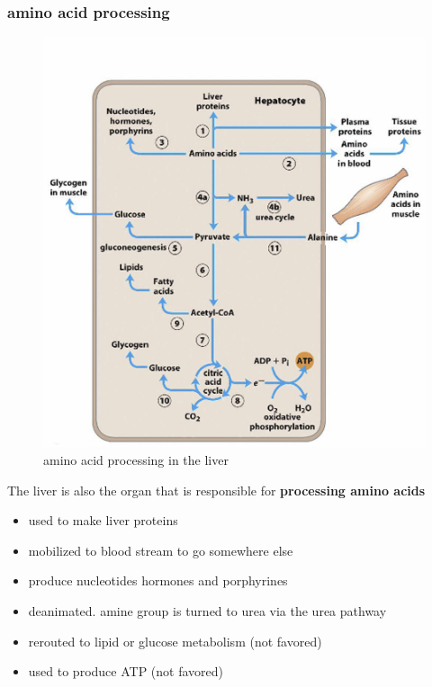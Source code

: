 \documentclass[../main.tex]{subfiles}
\begin{document}
\subsubsection{amino acid processing}
\begin{figure}[H]
    \centering
    \includegraphics[width=0.5\linewidth]{liverAminoAcid.png}
    \caption{amino acid processing in the liver}
    \label{fig:enter-label}
\end{figure}
The liver is also the organ that is responsible for \textbf{processing amino acids}
\begin{itemize}
    \item used to make liver proteins
    \item mobilized to blood stream to go somewhere else
    \item produce nucleotides hormones 
    and porphyrines 
    \item deanimated. amine group is turned to urea via the urea pathway
    \item rerouted to lipid or glucose metabolism (not favored)
    \item used to produce ATP (not favored)
\end{itemize}
\end{document}
